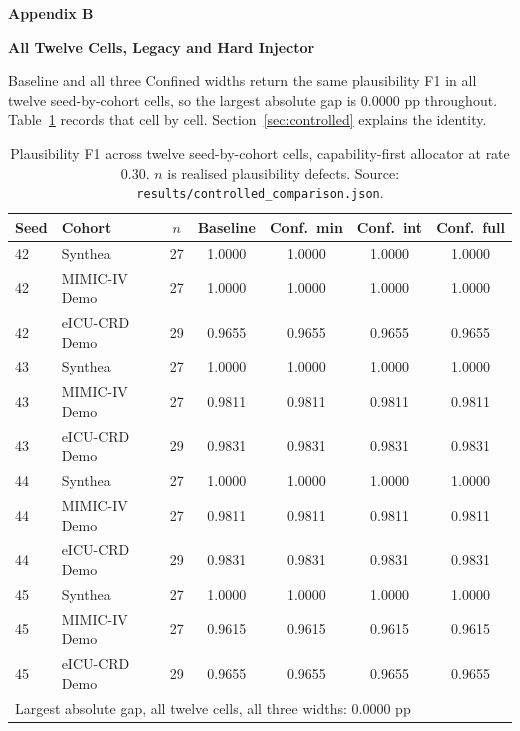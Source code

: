 \newpage
{}
{}
{\centering\normalfont\bfseries\large Appendix B\par}
{\centering\normalfont\bfseries\large All Twelve Cells, Legacy and Hard Injector\par}
\nopagebreak
\setcounter{table}{0}
\renewcommand{\thetable}{B\arabic{table}}

Baseline and all three Confined widths return the same plausibility F1 in all twelve seed-by-cohort
cells, so the largest absolute gap is $0.0000$ pp throughout. Table~\ref{tab:controlled} records
that cell by cell. Section~\ref{sec:controlled} explains the identity.

\begin{table}[!ht]
\centering
{}
\caption{Plausibility F1 across twelve seed-by-cohort cells, capability-first allocator at rate
$0.30$. $n$ is realised plausibility defects.
Source: \texttt{results/controlled\_comparison.json}.}
\label{tab:controlled}
\setlength{\tabcolsep}{4.5pt}
\begin{tabular}{llccccc}
\toprule
Seed & Cohort & $n$ & Baseline & Conf.\ min & Conf.\ int & Conf.\ full \\
\midrule
42 & Synthea & 27 & 1.0000 & 1.0000 & 1.0000 & 1.0000 \\
42 & MIMIC-IV Demo & 27 & 1.0000 & 1.0000 & 1.0000 & 1.0000 \\
42 & eICU-CRD Demo & 29 & 0.9655 & 0.9655 & 0.9655 & 0.9655 \\
43 & Synthea & 27 & 1.0000 & 1.0000 & 1.0000 & 1.0000 \\
43 & MIMIC-IV Demo & 27 & 0.9811 & 0.9811 & 0.9811 & 0.9811 \\
43 & eICU-CRD Demo & 29 & 0.9831 & 0.9831 & 0.9831 & 0.9831 \\
44 & Synthea & 27 & 1.0000 & 1.0000 & 1.0000 & 1.0000 \\
44 & MIMIC-IV Demo & 27 & 0.9811 & 0.9811 & 0.9811 & 0.9811 \\
44 & eICU-CRD Demo & 29 & 0.9831 & 0.9831 & 0.9831 & 0.9831 \\
45 & Synthea & 27 & 1.0000 & 1.0000 & 1.0000 & 1.0000 \\
45 & MIMIC-IV Demo & 27 & 0.9615 & 0.9615 & 0.9615 & 0.9615 \\
45 & eICU-CRD Demo & 29 & 0.9655 & 0.9655 & 0.9655 & 0.9655 \\
\midrule
\multicolumn{7}{l}{Largest absolute gap, all twelve cells, all three widths:
$\mathbf{0.0000}$ pp} \\
\bottomrule
\end{tabular}
\end{table}


